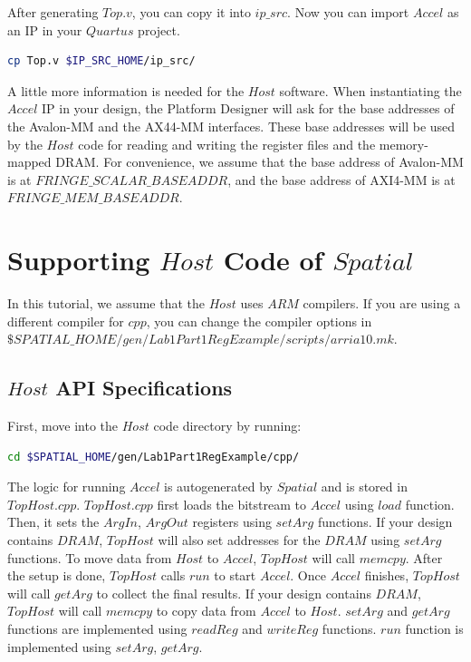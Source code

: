 \documentclass{article}
\begin{document}
After generating $Top.v$, you can copy it into $ip\_src$.
Now you can import $Accel$ as an IP in your $Quartus$ project.
\begin{lstlisting}[language=bash]
cp Top.v $IP_SRC_HOME/ip_src/
\end{lstlisting}

A little more information is needed for the $Host$ software.
When instantiating the $Accel$ IP in your design,
the Platform Designer will ask for the base addresses of the Avalon-MM and the AX44-MM interfaces.
These base addresses will be used by the $Host$ code for reading and writing the register files and the memory-mapped DRAM.
For convenience, we assume that the base address of Avalon-MM is at $FRINGE\_SCALAR\_BASEADDR$,
and the base address of AXI4-MM is at $FRINGE\_MEM\_BASEADDR$.

\section{Supporting $Host$ Code of $Spatial$}
In this tutorial, we assume that the $Host$ uses $ARM$ compilers.
If you are using a different compiler for $cpp$, you can change the compiler options in
$\$SPATIAL\_HOME/gen/Lab1Part1RegExample/scripts/arria10.mk$.

\subsection{$Host$ API Specifications}
First, move into the $Host$ code directory by running:
\begin{lstlisting}[language=bash]
cd $SPATIAL_HOME/gen/Lab1Part1RegExample/cpp/
\end{lstlisting}

The logic for running $Accel$ is autogenerated by $Spatial$ and is stored in $TopHost.cpp$.
$TopHost.cpp$ first loads the bitstream to $Accel$ using $load$ function.
Then, it sets the $ArgIn$, $ArgOut$ registers using $setArg$ functions.
If your design contains $DRAM$,  $TopHost$ will also set addresses for the $DRAM$ using $setArg$ functions.
To move data from $Host$ to $Accel$, $TopHost$ will call $memcpy$.
After the setup is done, $TopHost$ calls $run$ to start $Accel$.
Once $Accel$ finishes, $TopHost$ will call $getArg$ to collect the final results.
If your design contains $DRAM$, $TopHost$ will call $memcpy$ to copy data from $Accel$ to $Host$.
$setArg$ and $getArg$ functions are implemented using $readReg$ and $writeReg$ functions.
$run$ function is implemented using $setArg$, $getArg$.
\end{document}
